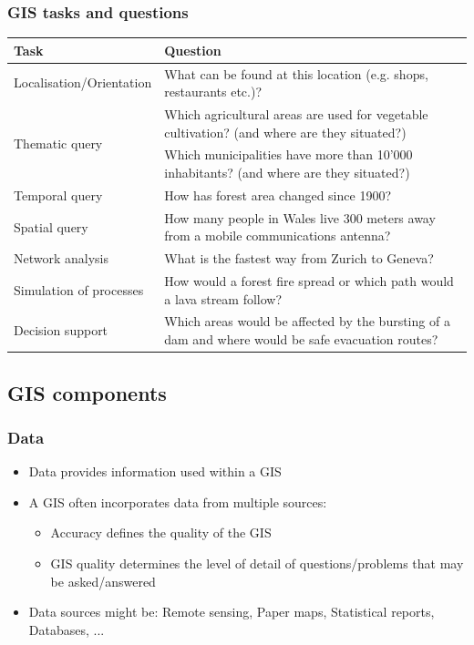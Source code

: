 \documentclass{article}
\begin{document}
\subsubsection{GIS tasks and questions}
\begin{center}
    \renewcommand{\arraystretch}{1.8}
    \begin{tabularx}{\textwidth}{|l|X|}
        \hline
        \textbf{Task} & \textbf{Question}\\
        \hline Localisation/Orientation & What can be found at this location (e.g. shops, restaurants etc.)?\\
        \hline \multirow{2}{*}{Thematic query} & Which agricultural areas are used for vegetable cultivation? (and where are they situated?)\\
        \cline{2-2}
        & Which municipalities have more than 10'000 inhabitants? (and where are they situated?)\\
        \hline Temporal query & How has forest area changed since 1900?\\
        \hline Spatial query & How many people in Wales live 300 meters away from a mobile communications antenna?\\
        \hline Network analysis & What is the fastest way from Zurich to Geneva?\\
        \hline Simulation of processes & How would a forest fire spread or which path would a lava stream follow?\\
        \hline Decision support & Which areas would be affected by the bursting of a dam and where would be safe evacuation routes?\\
        \hline
    \end{tabularx}
\end{center}

\subsection{GIS components}
\subsubsection{Data}
\begin{itemize}
    \item Data provides information used within a GIS
    \item A GIS often incorporates data from multiple sources:
    \begin{itemize}
        \item Accuracy defines the quality of the GIS
        \item GIS quality determines the level of detail of questions/problems that may be asked/answered
    \end{itemize}
    \item Data sources might be: Remote sensing, Paper maps, Statistical reports, Databases, ...
\end{itemize}
\end{document}
